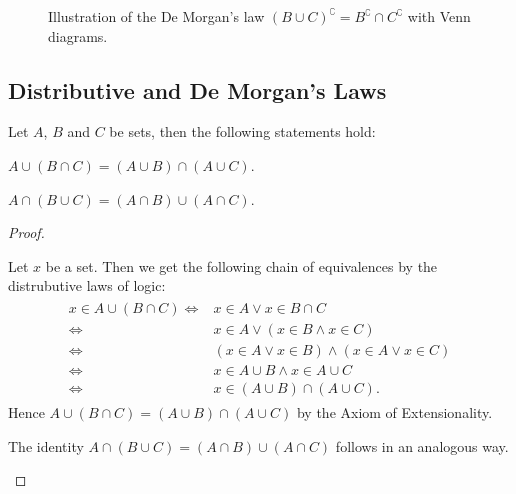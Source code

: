 \begin{figure}[ht]
    \caption{Illustration of the De Morgan's law $(B\cup C)^\complement=B^\complement\cap C^\complement$ with Venn diagrams.}\label{figure:sets:de_morgans_laws}
\end{figure}

\subsection{Distributive and De Morgan's Laws}

\begin{theorem}\label{theorem:sets:distributive_laws}
    Let $A$, $B$ and $C$ be sets, then the following statements hold:
    \begin{intheoremenumerate}
        \item $A\cup(B\cap C)=(A\cup B)\cap(A\cup C)$.
        \item $A\cap(B\cup C)=(A\cap B)\cup(A\cap C)$.
    \end{intheoremenumerate}
\end{theorem}
\begin{proof}
    \begin{proofenumerate}
        \item Let $x$ be a set. Then we get the following chain of equivalences by the distrubutive laws of logic:
        \begin{align}\begin{split}x\in A\cup(B\cap C)\iff& x\in A\lor x\in B\cap C\\
            \iff& x\in A\lor (x\in B\land x\in C)\\
            \iff& (x\in A\lor x\in B)\land (x\in A\lor x\in C)\\
            \iff& x\in A\cup B\land x\in A\cup C\\
            \iff& x\in (A\cup B)\cap (A\cup C).\end{split}\end{align}
        Hence $A\cup(B\cap C)=(A\cup B)\cap(A\cup C)$ by the Axiom of Extensionality.
        \item The identity $A\cap(B\cup C)=(A\cap B)\cup(A\cap C)$ follows in an analogous way.
    \end{proofenumerate}
\end{proof}

